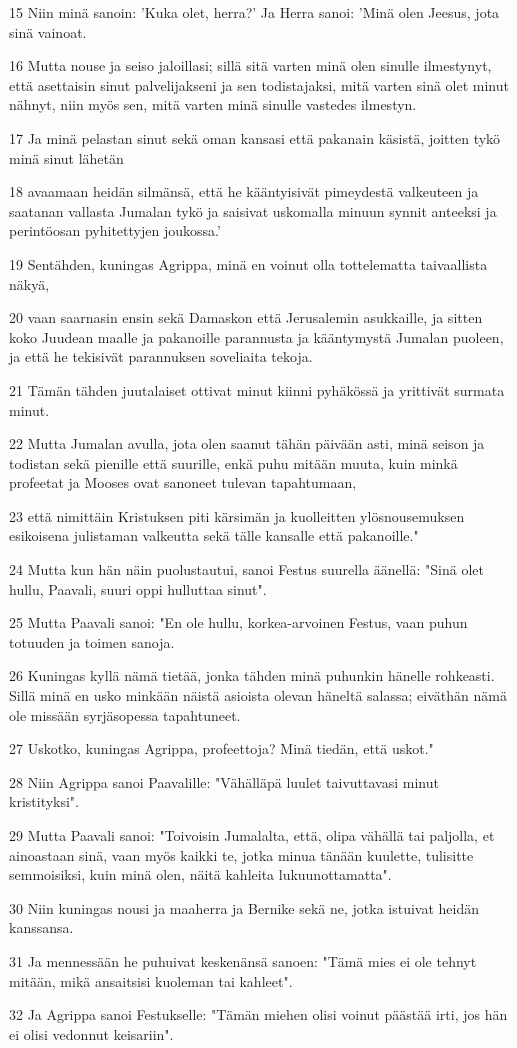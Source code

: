 \par 15 Niin minä sanoin: 'Kuka olet, herra?' Ja Herra sanoi: 'Minä olen Jeesus, jota sinä vainoat.
\par 16 Mutta nouse ja seiso jaloillasi; sillä sitä varten minä olen sinulle ilmestynyt, että asettaisin sinut palvelijakseni ja sen todistajaksi, mitä varten sinä olet minut nähnyt, niin myös sen, mitä varten minä sinulle vastedes ilmestyn.
\par 17 Ja minä pelastan sinut sekä oman kansasi että pakanain käsistä, joitten tykö minä sinut lähetän
\par 18 avaamaan heidän silmänsä, että he kääntyisivät pimeydestä valkeuteen ja saatanan vallasta Jumalan tykö ja saisivat uskomalla minuun synnit anteeksi ja perintöosan pyhitettyjen joukossa.'
\par 19 Sentähden, kuningas Agrippa, minä en voinut olla tottelematta taivaallista näkyä,
\par 20 vaan saarnasin ensin sekä Damaskon että Jerusalemin asukkaille, ja sitten koko Juudean maalle ja pakanoille parannusta ja kääntymystä Jumalan puoleen, ja että he tekisivät parannuksen soveliaita tekoja.
\par 21 Tämän tähden juutalaiset ottivat minut kiinni pyhäkössä ja yrittivät surmata minut.
\par 22 Mutta Jumalan avulla, jota olen saanut tähän päivään asti, minä seison ja todistan sekä pienille että suurille, enkä puhu mitään muuta, kuin minkä profeetat ja Mooses ovat sanoneet tulevan tapahtumaan,
\par 23 että nimittäin Kristuksen piti kärsimän ja kuolleitten ylösnousemuksen esikoisena julistaman valkeutta sekä tälle kansalle että pakanoille."
\par 24 Mutta kun hän näin puolustautui, sanoi Festus suurella äänellä: "Sinä olet hullu, Paavali, suuri oppi hulluttaa sinut".
\par 25 Mutta Paavali sanoi: "En ole hullu, korkea-arvoinen Festus, vaan puhun totuuden ja toimen sanoja.
\par 26 Kuningas kyllä nämä tietää, jonka tähden minä puhunkin hänelle rohkeasti. Sillä minä en usko minkään näistä asioista olevan häneltä salassa; eiväthän nämä ole missään syrjäsopessa tapahtuneet.
\par 27 Uskotko, kuningas Agrippa, profeettoja? Minä tiedän, että uskot."
\par 28 Niin Agrippa sanoi Paavalille: "Vähälläpä luulet taivuttavasi minut kristityksi".
\par 29 Mutta Paavali sanoi: "Toivoisin Jumalalta, että, olipa vähällä tai paljolla, et ainoastaan sinä, vaan myös kaikki te, jotka minua tänään kuulette, tulisitte semmoisiksi, kuin minä olen, näitä kahleita lukuunottamatta".
\par 30 Niin kuningas nousi ja maaherra ja Bernike sekä ne, jotka istuivat heidän kanssansa.
\par 31 Ja mennessään he puhuivat keskenänsä sanoen: "Tämä mies ei ole tehnyt mitään, mikä ansaitsisi kuoleman tai kahleet".
\par 32 Ja Agrippa sanoi Festukselle: "Tämän miehen olisi voinut päästää irti, jos hän ei olisi vedonnut keisariin".

